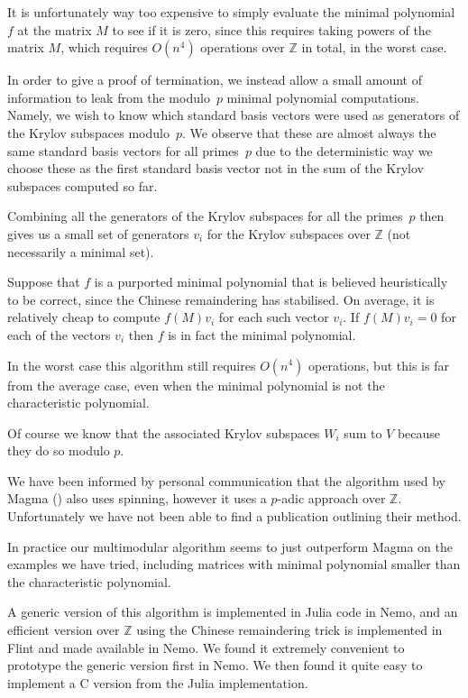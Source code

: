 \documentclass{sig-alternate-05-2015}
\begin{document}
It is unfortunately way too expensive to simply evaluate the minimal
polynomial $f$ at the matrix $M$ to see if it is zero, since this requires
taking powers of the matrix $M$, which requires $O(n^4)$ operations over
$\mathbb{Z}$ in total, in the worst case.

In order to give a proof of termination, we instead allow a small amount of
information to leak from the modulo~$p$ minimal polynomial computations.
Namely, we wish to know which standard basis vectors were used as
generators of the Krylov subspaces modulo~$p$. We observe that these are
almost always the same standard basis vectors for all primes~$p$ due to the
deterministic way we choose these as the first standard basis vector not
in the sum of the Krylov subspaces computed so far. 

Combining all the generators of the Krylov subspaces for all the primes~$p$
then gives us a small set of generators $v_i$ for the Krylov subspaces over
$\mathbb{Z}$ (not necessarily a minimal set).

Suppose that  $f$ is a purported minimal polynomial that is believed
heuristically to be correct, since the Chinese remaindering has stabilised.
On average, it is relatively cheap to compute $f(M)v_i$ for each such
vector $v_i$. If $f(M)v_i = 0$ for each of the vectors $v_i$ then $f$ is
in fact the minimal polynomial.

In the worst case this algorithm still requires $O(n^4)$ operations, but
this is far from the average case, even when the minimal polynomial is not
the characteristic polynomial.

Of course we know that the associated Krylov subspaces $W_i$ sum to $V$
because they do so modulo $p$.

We have been informed by personal communication that the algorithm used by
Magma (\cite{magma}) also uses spinning, however it uses a $p$-adic
approach over $\mathbb{Z}$. Unfortunately we have not been able to find a
publication outlining their method.

In practice our multimodular algorithm seems to just outperform Magma on the
examples we have tried, including matrices with minimal polynomial smaller 
than the characteristic polynomial.

A generic version of this algorithm is implemented in Julia code in Nemo, and
an efficient version over $\mathbb{Z}$ using the Chinese remaindering trick
is implemented in Flint and made available in Nemo.
We found it extremely convenient to prototype the generic version first in
Nemo. We then found it quite easy to implement a C version from the Julia
implementation.
\end{document}
